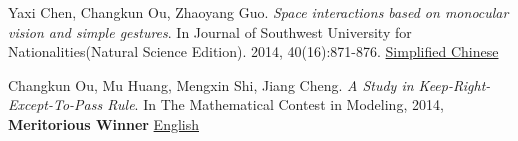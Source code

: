     \item{
        Yaxi Chen, Changkun Ou, Zhaoyang Guo.
        \emph{Space interactions based on monocular vision and simple gestures}. 
        In Journal of Southwest University for Nationalities(Natural Science Edition). 
        2014, 40(16):871-876. \href{https://changkun.us/files/cv/vision.swun.html}{Simplified Chinese}
    }
    \item{
        Changkun Ou, Mu Huang, Mengxin Shi, Jiang Cheng. 
        \emph{A Study in Keep-Right-Except-To-Pass Rule}. 
        In The Mathematical Contest in Modeling, 2014, \textbf{Meritorious Winner} \href{https://changkun.us/files/cv/28922.public.html}{English}
    }
 \resumeSubHeadingListEnd